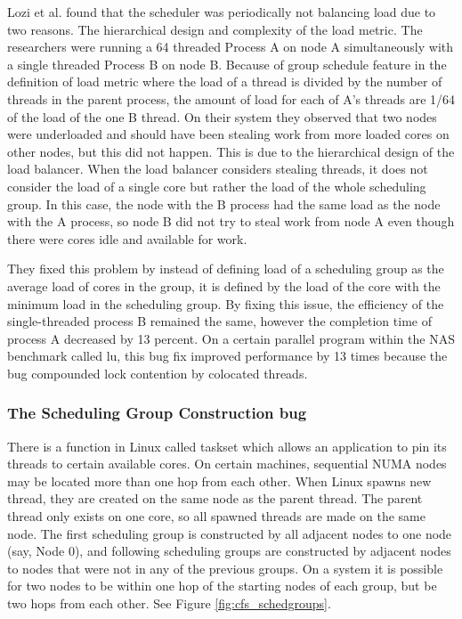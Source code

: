 \documentclass{sig-alternate}
\begin{document}
Lozi et al. found that the scheduler was periodically not balancing load due to two reasons. The hierarchical design and complexity of the load metric. The researchers were running a 64 threaded  Process A on node A simultaneously with a single threaded Process B on node B. Because of group schedule feature in the definition of load metric where the load of a thread is divided by the number of threads in the parent process, the amount of load for each of A's threads are 1/64 of the load of the one B thread. On their system they observed that two nodes were underloaded and should have been stealing work from more loaded cores on other nodes, but this did not happen. This is due to the hierarchical design of the load balancer. When the load balancer considers stealing threads, it does not consider the load of a single core but rather the load of the whole scheduling group. In this case, the node with the B process had the same load as the node with the A process, so node B did not try to steal work from node A even though there were cores idle and available for work.~\cite{Lozi:2016}

They fixed this problem by instead of defining load of a scheduling group as the average load of cores in the group, it is defined by the load of the core with the minimum load in the scheduling group. By fixing this issue, the efficiency of the single-threaded process B remained the same, however the completion time of process A decreased by 13 percent. On a certain parallel program within the NAS benchmark called lu, this bug fix improved performance by 13 times because the bug compounded lock contention by colocated threads.~\cite{Lozi:2016}

\subsubsection{The Scheduling Group Construction bug}
\label{sec:cfsfault_grpconstruct}

There is a function in Linux called taskset which allows an application to pin its threads to certain available cores. On certain machines, sequential NUMA nodes may be located more than one hop from each other. When Linux spawns new thread, they are created on the same node as the parent thread. The parent thread only exists on one core, so all spawned threads are made on the same node. The first scheduling group is constructed by all adjacent nodes to one node (say, Node 0), and following scheduling groups are constructed by adjacent nodes to nodes that were not in any of the previous groups. On a system it is possible for two nodes to be within one hop of the starting nodes of each group, but be two hops from each other. See Figure \ref{fig:cfs_schedgroups}.~\cite{Lozi:2016}
\end{document}
